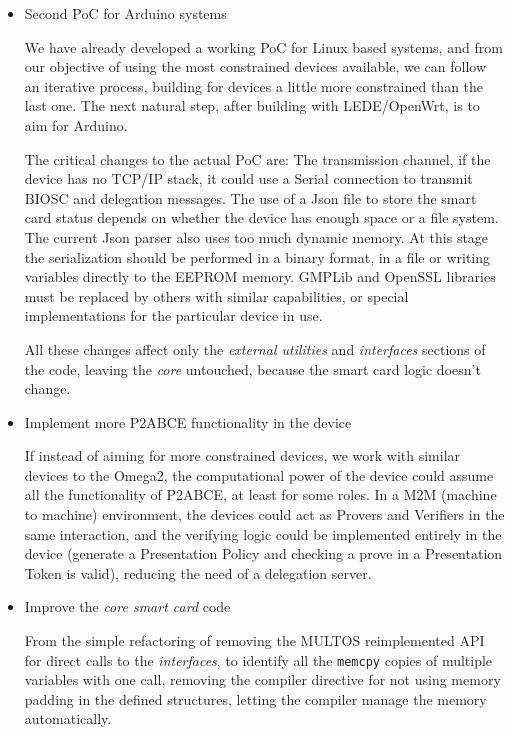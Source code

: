 \begin{itemize}
	\item Second PoC for Arduino systems
	
	We have already developed a working PoC for Linux based systems, and from our objective of using the most constrained devices available, we can follow an iterative process, building for devices a little more constrained than the last one. The next natural step, after building with LEDE/OpenWrt, is to aim for Arduino.
	
	The critical changes to the actual PoC are: 
	\subitem The transmission channel, if the device has no TCP/IP stack, it could use a Serial connection to transmit BIOSC and delegation messages.
	\subitem The use of a Json file to store the smart card status depends on whether the device has enough space or a file system. The current Json parser also uses too much dynamic memory. At this stage the serialization should be performed in a binary format, in a file or writing variables directly to the EEPROM memory.
	\subitem GMPLib and OpenSSL libraries must be replaced by others with similar capabilities, or special implementations for the particular device in use.
	
	All these changes affect only the \textit{external utilities} and \textit{interfaces} sections of the code, leaving the \textit{core} untouched, because the smart card logic doesn't change.
	
	\item Implement more P2ABCE functionality in the device
	
	If instead of aiming for more constrained devices, we work with similar devices to the Omega2, the computational power of the device could assume all the functionality of P2ABCE, at least for some roles. In a M2M (machine to machine) environment, the devices could act as Provers and Verifiers in the same interaction, and the verifying logic could be implemented entirely in the device (generate a Presentation Policy and checking a prove in a Presentation Token is valid), reducing the need of a delegation server.
	
	\item Improve the \textit{core smart card} code
	
	From the simple refactoring of removing the MULTOS reimplemented API for direct calls to the \textit{interfaces}, to identify all the \texttt{memcpy} copies of multiple variables with one call, removing the compiler directive for not using memory padding in the defined structures, letting the compiler manage the memory automatically.
	

\end{itemize}
